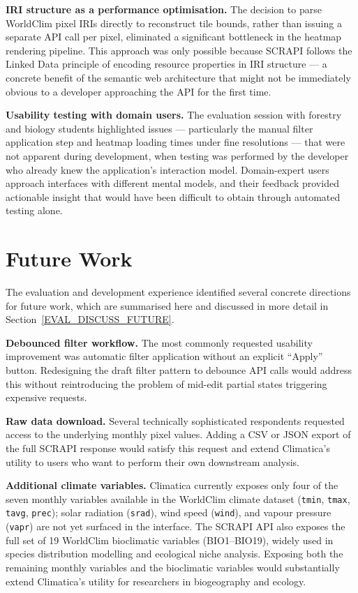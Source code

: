 \textbf{IRI structure as a performance optimisation.} The decision to parse
WorldClim pixel IRIs directly to reconstruct tile bounds, rather than issuing
a separate API call per pixel, eliminated a significant bottleneck in the
heatmap rendering pipeline. This approach was only possible because SCRAPI
follows the Linked Data principle of encoding resource properties in IRI
structure --- a concrete benefit of the semantic web architecture that might
not be immediately obvious to a developer approaching the API for the first time.

\textbf{Usability testing with domain users.} The evaluation session with
forestry and biology students highlighted issues --- particularly the manual
filter application step and heatmap loading times under fine resolutions ---
that were not apparent during development, when testing was performed by the
developer who already knew the application's interaction model. Domain-expert
users approach interfaces with different mental models, and their feedback
provided actionable insight that would have been difficult to obtain through
automated testing alone.

\section{Future Work}\label{CONC_FUTURE}

The evaluation and development experience identified several concrete directions
for future work, which are summarised here and discussed in more detail in
Section~\ref{EVAL_DISCUSS_FUTURE}.

\textbf{Debounced filter workflow.} The most commonly requested usability
improvement was automatic filter application without an explicit ``Apply''
button. Redesigning the draft filter pattern to debounce API calls would
address this without reintroducing the problem of mid-edit partial states
triggering expensive requests.

\textbf{Raw data download.} Several technically sophisticated respondents
requested access to the underlying monthly pixel values. Adding a CSV or JSON
export of the full SCRAPI response would satisfy this request and extend
Climatica's utility to users who want to perform their own downstream analysis.

\textbf{Additional climate variables.} Climatica currently exposes only four
of the seven monthly variables available in the WorldClim climate dataset
(\texttt{tmin}, \texttt{tmax}, \texttt{tavg}, \texttt{prec}); solar radiation
(\texttt{srad}), wind speed (\texttt{wind}), and vapour pressure
(\texttt{vapr}) are not yet surfaced in the interface. The SCRAPI API also
exposes the full set of 19 WorldClim bioclimatic variables (BIO1--BIO19),
widely used in species distribution modelling and ecological niche analysis.
Exposing both the remaining monthly variables and the bioclimatic variables
would substantially extend Climatica's utility for researchers in biogeography
and ecology.

